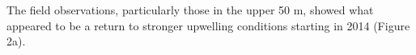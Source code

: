         The field observations, particularly those in the upper 50 m, showed what appeared to be a return to stronger upwelling conditions starting in 2014 (Figure 2a).




